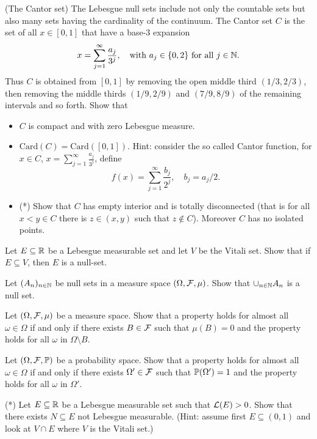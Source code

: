 \begin{problem}(The Cantor set) The Lebesgue null sets include not only the countable sets but also many sets having the cardinality of the continuum. The Cantor set $C$ is the set of all $x \in [0, 1]$ that have a base-$3$ expansion
\begin{equation*}
    x = \sum_{j=1}^\infty \frac{a_j}{3^j},\quad \text{with $a_j\in\{0,2\}$ for all $j\in \mathbb N$.}
\end{equation*} 
Thus $C$ is obtained from $[0,1]$ by removing the open middle third $(1/3,2/3)$, then removing the middle thirds $(1/9,2/9)$ and $(7/9,8/9)$ of the remaining intervals and so forth.
Show that 
\begin{itemize}
    \item $C$ is compact and with zero Lebesgue measure.
    \item $\mathrm{Card}(C) = \mathrm{Card}([0,1])$. Hint: consider the so called Cantor function, for $x\in C$, $x=\sum_{j=1}^\infty \frac{a_j}{3^j}$, define
    \begin{equation*}
        f(x) =\sum_{j=1}^\infty \frac{b_j}{2^j},\quad b_j=a_j/2.
    \end{equation*}
    \item (*) Show that $C$ has empty interior and is totally disconnected (that is for all $x<y\in C$ there is $z\in(x,y)$ such that $z\notin C$). Moreover $C$ has no isolated points.
\end{itemize}
\end{problem}

\begin{problem}
    Let $E\subseteq \mathbb R$ be a Lebesgue measurable set and let $V$ be the Vitali set. Show that if $E \subseteq V$, then $E$ is a null-set.
\end{problem}

\begin{problem}
    Let $(A_n)_{n\in \mathbb N}$ be null sets in a measure space $(\Omega,\mathcal F,\mu)$. Show that $\cup_{n\in \mathbb N} A_n$ is a null set.
\end{problem}

\begin{problem}
    Let $(\Omega,\mathcal F,\mu)$ be a measure space. Show that a property holds for almost all $\omega\in \Omega$ if and only if there exists $B \in \mathcal F$ such that $\mu(B)=0$ and the property holds for all $\omega$ in $\Omega\setminus B$.
\end{problem}

\begin{problem}
    Let $(\Omega,\mathcal F,\mathbb P)$ be a probability space. Show that a property holds for almost all $\omega\in \Omega$ if and only if there exists $\Omega'\in \mathcal F$ such that $\mathbb P(\Omega')=1$ and the property holds for all $\omega$ in $\Omega'$.
\end{problem}

\begin{problem}(*) Let $E\subseteq \mathbb R$ be a Lebesgue measurable set such that $\mathcal L(E)>0$. Show that there exists $N\subseteq E$ not Lebesgue measurable. (Hint: assume first $E\subseteq (0,1)$ and look at $V\cap E$ where $V$ is the Vitali set.) 
\end{problem}

